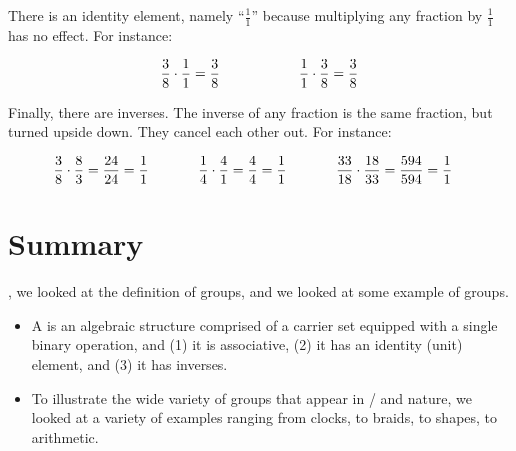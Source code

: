 \documentclass[../../../main.tex]{subfiles}
\begin{document}
There is an identity element, namely ``$\frac{1}{1}$'' because multiplying any fraction by $\frac{1}{1}$ has no effect. For instance:

\begin{equation*}
  \frac{3}{8} \mult/ \frac{1}{1} = \frac{3}{8} \hskip 2cm
  \frac{1}{1} \mult/ \frac{3}{8} = \frac{3}{8}
\end{equation*}

Finally, there are inverses. The inverse of any fraction is the same fraction, but turned upside down. They cancel each other out. For instance:

\begin{align*}
  \frac{3}{8} \mult/ \frac{8}{3} = \frac{24}{24} = \frac{1}{1} \hskip 1.25cm
  \frac{1}{4} \mult/ \frac{4}{1} = \frac{4}{4} = \frac{1}{1} \hskip 1.25cm
  \frac{33}{18} \mult/ \frac{18}{33} &= \frac{594}{594} = \frac{1}{1}
\end{align*}


\section{Summary}

, we looked at the definition of groups, and we looked at some example of groups.

\begin{itemize}

  \item A  is an algebraic structure comprised of a carrier set equipped with a single binary operation, and (1) it is associative, (2) it has an identity (unit) element, and (3) it has inverses. 
  
  \item To illustrate the wide variety of groups that appear in \math/ and nature, we looked at a variety of examples ranging from clocks, to braids, to shapes, to arithmetic.

\end{itemize}
\end{document}
